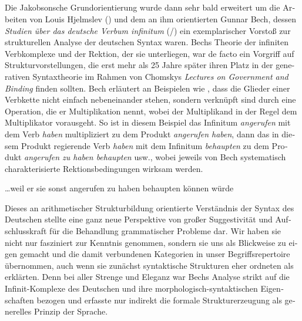\documentclass[output=paper,colorlinks,citecolor=brown]{langscibook}
\begin{document}
\begin{otherlanguage}{german}
\section{}\label{sec:1}

Die Jakobsonsche Grundorientierung wurde dann sehr bald erweitert um die Arbeiten von Louis Hjelmslev (\citeyear{Hjelmslev1943,Hjelmslev1961}) und dem an ihm orientierten Gunnar Bech, dessen \textit{Studien über das deutsche Verbum infinitum} (\citeyear{Bech1955}/\citeyear{Bech1957}) ein exemplarischer Vorstoß zur strukturellen Analyse der deutschen Syntax waren. Bechs Theorie der infiniten Verbkomplexe und der Rektion, der sie unterliegen, war de facto ein Vorgriff auf Strukturvorstellungen, die erst mehr als 25 Jahre später ihren Platz in der generativen Syntaxtheorie im Rahmen von Chomskys \textit{Lectures on Government and Binding} \citep{Chomsky1981} finden sollten. Bech erläutert an Beispielen wie , dass die Glieder einer Verbkette nicht einfach nebeneinander stehen, sondern verknüpft sind durch eine Operation, die er \glqq Multiplikation\grqq{} nennt, wobei der Multiplikand in der Regel dem Multiplikator vorausgeht. So ist in diesem Beispiel das Infinitum \textit{angerufen} mit dem Verb \textit{haben} multipliziert zu dem Produkt \textit{angerufen haben}, dann das in diesem Produkt regierende Verb \textit{haben} mit dem Infinitum \textit{behaupten} zu dem Produkt \textit{angerufen zu haben behaupten} usw., wobei jeweils von Bech systematisch charakterisierte Rektionsbedingungen wirksam werden.

\ea
\ldots weil er sie sonst angerufen zu haben behaupten können würde
\label{ex:1}
\z

\noindent Dieses an arithmetischer Strukturbildung orientierte Verständnis der Syntax des Deutschen stellte eine ganz neue Perspektive von großer Suggestivität und Aufschlusskraft für die Behandlung grammatischer Probleme dar. Wir haben sie nicht nur fasziniert zur Kenntnis genommen, sondern sie uns als Blickweise zu eigen gemacht und die damit verbundenen Kategorien in unser Begriffsrepertoire übernommen, auch wenn sie zunächst syntaktische Strukturen eher ordneten als erklärten. Denn bei aller Strenge und Eleganz war Bechs Analyse strikt auf die Infinit-Komplexe des Deutschen und ihre morphologisch-syntaktischen Eigenschaften bezogen und erfasste nur indirekt die formale Strukturerzeugung als generelles Prinzip der Sprache.


\end{otherlanguage}
\end{document}
